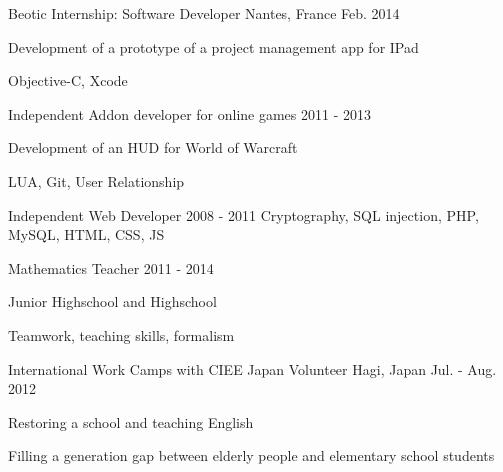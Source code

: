 \begin{cventries}
  \cventrysix
    {Beotic} %
    {Internship: Software Developer} %
    {Nantes, France} %
    {Feb. 2014} %
    {
      \begin{cvitems} %
        \item {Development of a prototype of a project management app for IPad}
      \end{cvitems}
    }%
    {Objective-C, Xcode}


  \cventrysix
    {} %
    {Independent Addon developer for online games} %
    {} %
    {2011 - 2013} %
    {
      \begin{cvitems} %
        \item {Development of an HUD for World of Warcraft}
      \end{cvitems}
    }%
    {LUA, Git, User Relationship}


  \cventryskill
    {} %
    {Independent Web Developer} %
    {} %
    {2008 - 2011} %
    {Cryptography, SQL injection, PHP, MySQL, HTML, CSS, JS}




  \cventrysix
    {} %
    {Mathematics Teacher} %
    {} %
    {2011 - 2014} %
    {
      \begin{cvitems} %
        \item {Junior Highschool and Highschool}
      \end{cvitems}
    }%
    {Teamwork, teaching skills, formalism}


  \cventry
    {International Work Camps with CIEE Japan} %
    {Volunteer} %
    {Hagi, Japan} %
    {Jul. - Aug. 2012} %
    {
      \begin{cvitems} %
        \item {Restoring a school and teaching English}
        \item {Filling a generation gap between elderly people and elementary school students}
      \end{cvitems}
    }%

\end{cventries}

